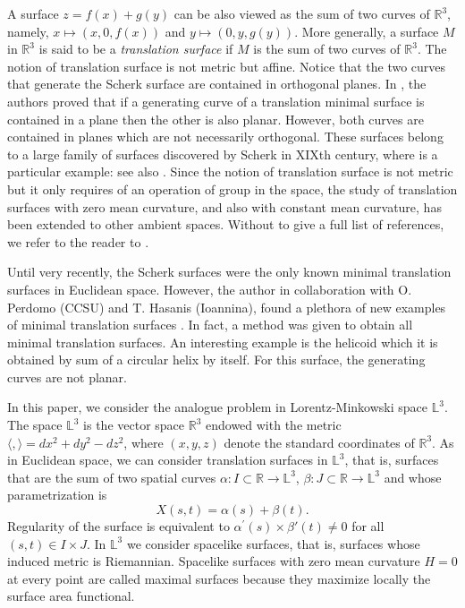 \documentclass[a4paper,12pt]{amsart}
\numberwithin{equation}{section}
\theoremstyle{definition}
\def\r{\mathbb R}
\def\r{\mathbb R}
\def\rr{\mathbb L}
\begin{document}
A surface $z=f(x)+g(y)$ can be also viewed as the sum of two curves of $\r^3$, namely, $x\mapsto (x,0,f(x))$ and $y\mapsto (0,y,g(y))$. More generally, a surface $M$ in $\r^3$ is said to be a {\it translation surface} if $M$ is the sum of two  curves of $\r^3$.  The notion of translation surface is not metric but affine. Notice that the   two curves that generate the Scherk surface are contained in orthogonal planes. In \cite{di},  the authors proved that if a generating curve of a translation minimal surface is contained in a plane then the other is also planar. However, both curves are contained in planes which are not necessarily orthogonal. These surfaces belong to a large family of surfaces discovered by Scherk in XIXth century, where \cite{sc} is a particular example: see also \cite{ni}. Since the notion of translation surface is not metric but it only requires of an operation of group in the space, the study of translation surfaces with zero mean curvature, and also with constant mean curvature, has been extended to other ambient spaces. Without to give a full list of references, we refer to the reader to \cite{ay,hl2,Lopez,lomu,mi}.

Until very recently, the Scherk surfaces were the only known minimal translation surfaces in Euclidean space. 
However, the author in collaboration with O. Perdomo (CCSU) and T. Hasanis (Ioannina), found a plethora of new examples of minimal translation surfaces  \cite{hl,lp}. In fact,   a method was given to obtain all minimal translation surfaces.  An interesting example is the helicoid which it is obtained  by sum of a circular helix by itself. For this surface, the generating curves are not planar.

 

In this paper, we consider the analogue problem in Lorentz-Minkowski space $\rr^3$. The space $\rr^3$ is  the vector space  $\r^3$  endowed with the metric $\langle,\rangle =dx^2+dy^2-dz^2$, where $(x,y,z)$ denote the standard coordinates of $\r^3$. As in Euclidean space, we can consider  translation surfaces in $\rr^3$, that is, surfaces that are the sum of two spatial curves  $\alpha:I\subset\r \rightarrow\rr^3$, $\beta:J\subset\r\rightarrow\rr^3$ and whose parametrization is
\begin{equation}\label{tt}
X(s,t)=\alpha(s)+\beta(t).
\end{equation}
Regularity of the surface is equivalent to $\alpha^\prime(s)\times\beta'(t)\not=0$ for all $(s,t)\in I\times J$. In $\rr^3$ we consider spacelike surfaces, that is, surfaces whose   induced metric is Riemannian. Spacelike surfaces with zero mean curvature $H=0$ at every point are called maximal surfaces because they maximize locally the surface area functional. 
\end{document}
